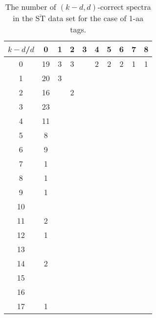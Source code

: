 \documentclass{article}
\def\STbar{{\overline{\mathrm{ST}}}}
\begin{document}
\begin{landscape}

\begin{table}[h]\footnotesize
{\centering
\begin{tabular}{|c|c|
c|c|c|c|c|c|c|c|}
  \hline
  $k-d$/$d$ 
 & 0 & 1 & 2 & 3 & 4 & 5 & 6 & 7 & 8\\

  \hline
  \hline

0  & 19 & 3 & 3 &  & 2 & 2 & 2 & 1 & 1\\

1  & 20 & 3 &  &  &  &  &  &  & \\

2  & 16 &  & 2 &  &  &  &  &  & \\

3  & 23 &  &  &  &  &  &  &  & \\

4  & 11 &  &  &  &  &  &  &  & \\

5  & 8 &  &  &  &  &  &  &  & \\

6  & 9 &  &  &  &  &  &  &  & \\

7  & 1 &  &  &  &  &  &  &  & \\

8  & 1 &  &  &  &  &  &  &  & \\

9  & 1 &  &  &  &  &  &  &  & \\

10  &  &  &  &  &  &  &  &  & \\

11  & 2 &  &  &  &  &  &  &  & \\

12  & 1 &  &  &  &  &  &  &  & \\

13  &  &  &  &  &  &  &  &  & \\

14  & 2 &  &  &  &  &  &  &  & \\

15  &  &  &  &  &  &  &  &  & \\

16  &  &  &  &  &  &  &  &  & \\

17  & 1 &  &  &  &  &  &  &  & \\

  \hline
\end{tabular}
\par}
\centering
\caption{The number of $(k-d,d)$-correct spectra in the $\STbar$ data set for the case of 1-aa tags.}
\vspace{3mm}
\label{table:kd-1-ST}
\end{table}
\end{landscape}
\end{document}
